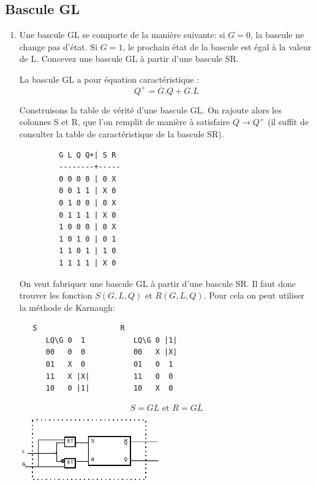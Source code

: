 \documentclass[a4paper,10pt]{exam}
\begin{document}
\subsection{Bascule GL}
\begin{enumerate}
  \item Une bascule GL se comporte de la manière suivante: si $G = 0$, la
    bascule ne change pas d'état. Si $G = 1$, le prochain état de la bascule
    est égal à la valeur de L. Concevez une bascule GL à partir d'une bascule
    SR.

    \begin{solution}

      La bascule GL a pour équation caractéristique :
      $$ Q^{+} = \overline{G}.Q + G.L $$

      Construisons la table de vérité d'une bascule GL.
      On rajoute alors les colonnes S et R, que l'on remplit de manière
      à satisfaire $Q \rightarrow Q^{+}$ (il suffit de consulter la table
      de caractéristique de la bascule SR).

\begin{verbatim}
         G L Q Q+| S R
         --------+-----
         0 0 0 0 | 0 X
         0 0 1 1 | X 0
         0 1 0 0 | 0 X
         0 1 1 1 | X 0
         1 0 0 0 | 0 X
         1 0 1 0 | 0 1
         1 1 0 1 | 1 0
         1 1 1 1 | X 0
\end{verbatim}

      On veut fabriquer une bascule GL à partir d'une bascule SR.
      Il faut donc trouver les fonction $S(G,L,Q)$ et $R(G,L,Q)$.
      Pour cela on peut utiliser la méthode de Karnaugh:

\begin{verbatim}
   S                   R
      LQ\G 0  1           LQ\G 0 |1|
      00   0  0           00   X |X|
      01   X  0           01   0  1
      11   X |X|          11   0  0
      10   0 |1|          10   X  0
\end{verbatim}

$$ S = GL \textrm{ et } R = G\overline{L} $$

      \includegraphics[width=6cm]{TD8-GL}
    \end{solution}

\end{enumerate}
\end{document}
